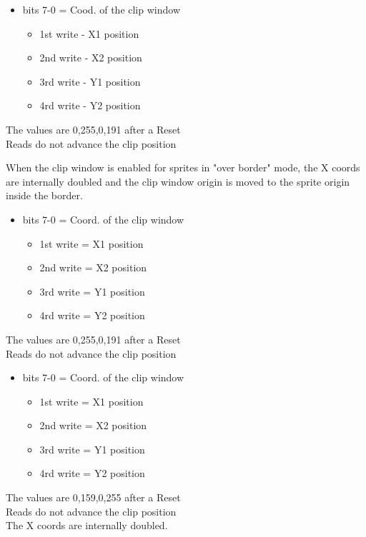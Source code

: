 \begin{itemize}
\item bits 7-0 = Cood. of the clip window
  \begin{itemize}
  \item[] 1st write - X1 position
  \item[] 2nd write - X2 position
  \item[] 3rd write - Y1 position
  \item[] 4rd write - Y2 position
  \end{itemize}
\end{itemize}
The values are 0,255,0,191 after a Reset\\
Reads do not advance the clip position

When the clip window is enabled for sprites in "over border" mode, the
X coords are internally doubled and the clip window origin is moved to
the sprite origin inside the border.

\begin{itemize}
\item bits 7-0 = Coord. of the clip window
  \begin{itemize}
  \item[] 1st write = X1 position
  \item[] 2nd write = X2 position
  \item[] 3rd write = Y1 position
  \item[] 4rd write = Y2 position
  \end{itemize}
\end{itemize}
The values are 0,255,0,191 after a Reset\\
Reads do not advance the clip position

\begin{itemize}
\item bits 7-0 = Coord. of the clip window
  \begin{itemize}
  \item[] 1st write = X1 position
  \item[] 2nd write = X2 position
  \item[] 3rd write = Y1 position
  \item[] 4rd write = Y2 position
  \end{itemize}
\end{itemize}
The values are 0,159,0,255 after a Reset\\
Reads do not advance the clip position\\
The X coords are internally doubled.

